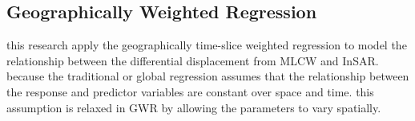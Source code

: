 \subsection{Geographically Weighted Regression}
\label{subsec:gwr_method}

this research apply the geographically time-slice weighted regression to model the relationship between the differential displacement from MLCW and InSAR. because the traditional or global regression assumes that the relationship between the response and predictor variables are constant over space and time. this assumption is relaxed in GWR by allowing the parameters to vary spatially. 


%
%
%
